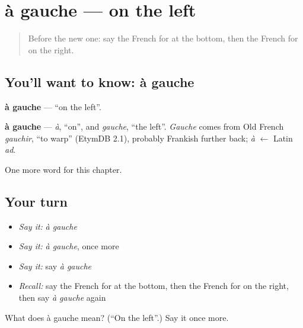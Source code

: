 \section[à gauche]{à gauche — on the left}

\label{lesson:FR-C188-a-gauche}



\begin{quote}
Before the new one: say the French for at the bottom, then the French for on the right.
\end{quote}

\subsection*{You'll want to know: à gauche}
\textbf{à gauche} — \textquotedblleft{}on the left\textquotedblright{}.

\begin{cousinweb}
\textbf{à gauche} — \emph{à}, \textquotedblleft{}on\textquotedblright{}, and \emph{gauche}, \textquotedblleft{}the left\textquotedblright{}. \emph{Gauche} comes from Old French \emph{gauchir}, \textquotedblleft{}to warp\textquotedblright{} (EtymDB 2.1), probably Frankish further back; \emph{à} $\leftarrow$ Latin \emph{ad}.
\end{cousinweb}

\begin{grammarlens}[title={What you've built}]
One more word for this chapter.
\end{grammarlens}

\subsection*{Your turn}
\begin{itemize}
\raggedright
  \item \emph{Say it:} \emph{à gauche}
  \item \emph{Say it:} \emph{à gauche}, once more
  \item \emph{Say it:} say \emph{à gauche}
  \item \emph{Recall:} say the French for at the bottom, then the French for on the right, then say \emph{à gauche} again
\end{itemize}

\begin{tcolorbox}[breakable,colback=teal!4,colframe=teal!35!black,title={Before you move on}]
What does à gauche mean? (\textquotedblleft{}On the left\textquotedblright{}.) Say it once more.
\end{tcolorbox}
